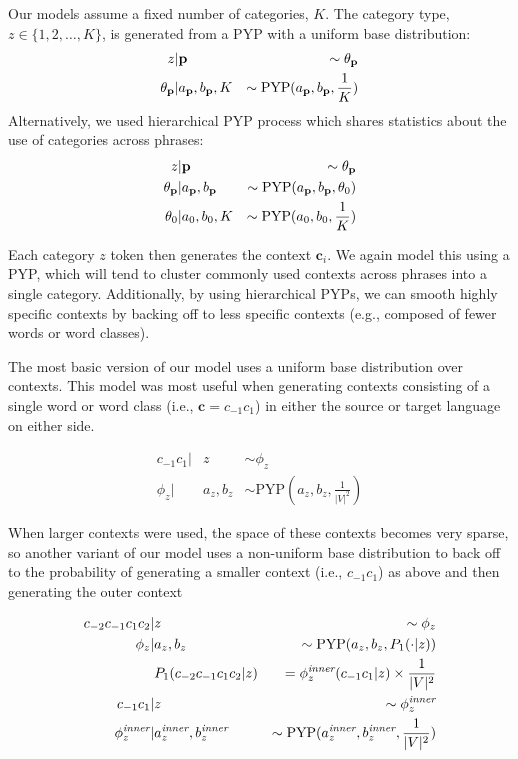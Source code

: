 Our models assume a fixed number of categories, $K$. The category type, $z \in \{ 1 , 2 , \ldots , K \}$, is generated from a PYP with a uniform base distribution:
\begin{align*}
z &| \p & \sim \theta_{\p} \\
\theta_{\p} &| a_{\p},b_{\p},K & \sim \textrm{PYP}(a_{\p},b_{\p},\frac{1}{K})
\end{align*}
\noindent Alternatively, we used hierarchical PYP process which shares statistics about the use of categories across phrases:
\begin{align*}
z &| \p & \sim \theta_{\p} \\
\theta_{\p} &| a_{\p},b_{\p} & \sim \textrm{PYP}(a_{\p},b_{\p},\theta_0) \\
\theta_0 &| a_0,b_0,K & \sim \textrm{PYP}(a_0,b_0,\frac{1}{K})
\end{align*}

\noindent Each category $z$ token then generates the context $\textbf{c}_i$. We again model this using a PYP, which will tend to cluster commonly used contexts across phrases into a single category. Additionally, by using hierarchical PYPs, we can smooth highly specific contexts by backing off to less specific contexts (e.g., composed of fewer words or word classes).

The most basic version of our model uses a uniform base distribution over contexts. This model was most useful when generating contexts consisting of a single word or word class (i.e., $\textbf{c}=c_{-1}c_1$) in either the source or target language on either side.

\begin{align*}
c_{-1}c_1 |& z & \sim \phi_z \\
\phi_z |& a_z,b_z & \sim \textrm{PYP}(a_z,b_z,\frac{1}{|V|^2})
\end{align*}

\noindent When larger contexts were used, the space of these contexts becomes very sparse, so another variant of our model uses a non-uniform base distribution to back off to the probability of generating a smaller context (i.e., $c_{-1}c_1$) as above and then generating the outer context

\begin{align*}
c_{-2}c_{-1}c_1c_2 |& z & \sim \phi_z \\
\phi_z |& a_z,b_z & \sim \textrm{PYP}(a_z,b_z,P_1(\cdot|z)) \\
&P_1(c_{-2}c_{-1}c_1c_2|z)& = \phi^{\textrm{\emph{inner}}}_z(c_{-1}c_1|z) \times \frac{1}{|V|^2} \\
c_{-1}c_1 |& z & \sim \phi^{\textrm{\emph{inner}}}_z \\
\phi^{\textrm{\emph{inner}}}_z |& a^{\textrm{\emph{inner}}}_z,b^{\textrm{\emph{inner}}}_z & \sim \textrm{PYP}(a^{\textrm{\emph{inner}}}_z,b^{\textrm{\emph{inner}}}_z,\frac{1}{|V|^2})
\end{align*}

